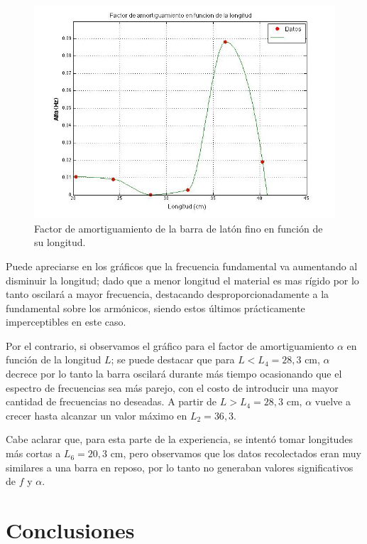 \documentclass[twoside,twocolumn,a4paper]{article}
\begin{document}
\begin{figure}[H]
\includegraphics[width=\linewidth]{avsl.jpg}
\caption{Factor de amortiguamiento de la barra de lat\'on fino en funci\'on de su longitud.}
\label{fig:avsl}
\end{figure}

Puede apreciarse en los gr\'aficos que la frecuencia fundamental va aumentando al disminuir la longitud; dado que a menor longitud el material es mas r\'igido por lo tanto oscilar\'a a mayor frecuencia, destacando desproporcionadamente a la fundamental sobre los arm\'onicos, siendo estos \'ultimos pr\'acticamente imperceptibles en este caso. \newline

Por el contrario, si observamos el gr\'afico para el factor de amortiguamiento $\alpha$ en funci\'on de la longitud $L$; se puede destacar que para $L < L_{4} = 28,3$ cm, $\alpha$ decrece por lo tanto la barra oscilar\'a durante m\'as tiempo ocasionando que el espectro de frecuencias sea m\'as parejo, con el costo de introducir una mayor cantidad de frecuencias no deseadas.
A partir de $L > L_{4} = 28,3$ cm, $\alpha$ vuelve a crecer hasta alcanzar un valor m\'aximo en $L_{2} = 36,3$.

Cabe aclarar que, para esta parte de la experiencia, se intent\'o tomar longitudes m\'as cortas a $L_{6} = 20,3$ cm, pero observamos que los datos recolectados eran muy similares a una barra en reposo, por lo tanto no generaban valores significativos de $f$ y $\alpha$.


\section{Conclusiones}
\end{document}

